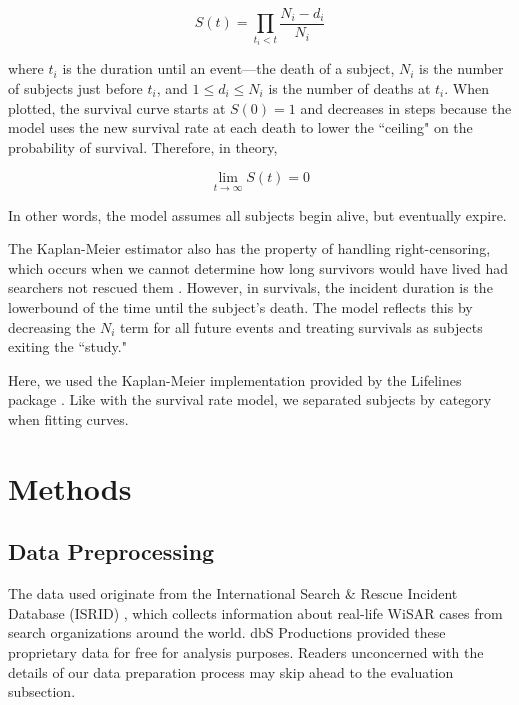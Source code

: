\documentclass[12pt,titlepage]{article}
\begin{document}
      $$S(t) = \prod_{t_i < t} \frac{N_i - d_i}{N_i}$$

      where $t_i$ is the duration until an event---the death of a subject,
      $N_i$ is the number of subjects just before $t_i$, and $1 \leq d_i \leq
      N_i$ is the number of deaths at $t_i$. When plotted, the survival curve
      starts at $S(0) = 1$ and decreases in steps because the model uses the
      new survival rate at each death to lower the ``ceiling" on the
      probability of survival. Therefore, in theory,

      $$\lim_{t \to \infty} S(t) = 0$$

      In other words, the model assumes all subjects begin alive, but
      eventually expire.

      The Kaplan-Meier estimator also has the property of handling
      right-censoring, which occurs when we cannot determine how long survivors
      would have lived had searchers not rescued them \cite{rich}. However, in
      survivals, the incident duration is the lowerbound of the time until the
      subject's death. The model reflects this by decreasing the $N_i$ term for
      all future events and treating survivals as subjects exiting the
      ``study."

      Here, we used the Kaplan-Meier implementation provided by the Lifelines
      package \cite{lifelines}. Like with the survival rate model, we separated
      subjects by category when fitting curves.

  \section{Methods}
    \subsection{Data Preprocessing}
      The data used originate from the International Search \& Rescue Incident
      Database (ISRID) \cite{isrid}, which collects information about real-life
      WiSAR cases from search organizations around the world. dbS Productions
      provided these proprietary data for free for analysis purposes. Readers
      unconcerned with the details of our data preparation process may skip
      ahead to the evaluation subsection.

\end{document}
